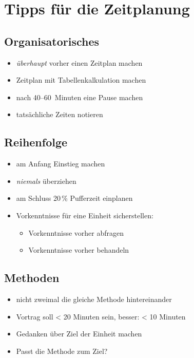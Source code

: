 \chapter{Tipps für die Zeitplanung}
\label{workshop-zeitplanung}

\section{Organisatorisches}
\begin{itemize}
  \item \emph{überhaupt} vorher einen Zeitplan machen
  \item Zeitplan mit Tabellenkalkulation machen
  \item nach 40--60~Minuten eine Pause machen
  \item tatsächliche Zeiten notieren
\end{itemize}

\section{Reihenfolge}
\begin{itemize}
  \item am Anfang Einstieg machen
  \item \emph{niemals} überziehen
  \item am Schluss 20\,\% Pufferzeit einplanen
  \item Vorkenntnisse für eine Einheit sicherstellen:
    \begin{itemize}
      \item Vorkenntnisse vorher abfragen
      \item Vorkenntnisse vorher behandeln
    \end{itemize}
\end{itemize}

\section{Methoden}
\begin{itemize}
  \item nicht zweimal die gleiche Methode hintereinander
  \item Vortrag soll < 20 Minuten sein, besser: < 10 Minuten
  \item Gedanken über Ziel der Einheit machen
  \item Passt die Methode zum Ziel?
\end{itemize}
